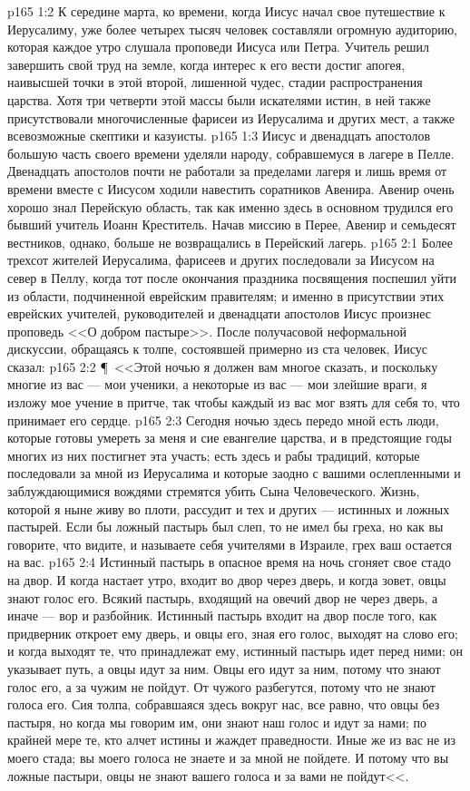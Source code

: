 \vs p165 1:2 К середине марта, ко времени, когда Иисус начал свое путешествие к Иерусалиму, уже более четырех тысяч человек составляли огромную аудиторию, которая каждое утро слушала проповеди Иисуса или Петра. Учитель решил завершить свой труд на земле, когда интерес к его вести достиг апогея, наивысшей точки в этой второй, лишенной чудес, стадии распространения царства. Хотя три четверти этой массы были искателями истин, в ней также присутствовали многочисленные фарисеи из Иерусалима и других мест, а также всевозможные скептики и казуисты.
\vs p165 1:3 Иисус и двенадцать апостолов большую часть своего времени уделяли народу, собравшемуся в лагере в Пелле. Двенадцать апостолов почти не работали за пределами лагеря и лишь время от времени вместе с Иисусом ходили навестить соратников Авенира. Авенир очень хорошо знал Перейскую область, так как именно здесь в основном трудился его бывший учитель Иоанн Креститель. Начав миссию в Перее, Авенир и семьдесят вестников, однако, больше не возвращались в Перейский лагерь.
\vs p165 2:1 Более трехсот жителей Иерусалима, фарисеев и других последовали за Иисусом на север в Пеллу, когда тот после окончания праздника посвящения поспешил уйти из области, подчиненной еврейским правителям; и именно в присутствии этих еврейских учителей, руководителей и двенадцати апостолов Иисус произнес проповедь <<О добром пастыре>>. После получасовой неформальной дискуссии, обращаясь к толпе, состоявшей примерно из ста человек, Иисус сказал:
\vs p165 2:2 \P\ <<Этой ночью я должен вам многое сказать, и поскольку многие из вас --- мои ученики, а некоторые из вас --- мои злейшие враги, я изложу мое учение в притче, так чтобы каждый из вас мог взять для себя то, что принимает его сердце.
\vs p165 2:3 Сегодня ночью здесь передо мной есть люди, которые готовы умереть за меня и сие евангелие царства, и в предстоящие годы многих из них постигнет эта участь; есть здесь и рабы традиций, которые последовали за мной из Иерусалима и которые заодно с вашими ослепленными и заблуждающимися вождями стремятся убить Сына Человеческого. Жизнь, которой я ныне живу во плоти, рассудит и тех и других --- истинных и ложных пастырей. Если бы ложный пастырь был слеп, то не имел бы греха, но как вы говорите, что видите, и называете себя учителями в Израиле, грех ваш остается на вас.
\vs p165 2:4 Истинный пастырь в опасное время на ночь сгоняет свое стадо на двор. И когда настает утро, входит во двор через дверь, и когда зовет, овцы знают голос его. Всякий пастырь, входящий на овечий двор не через дверь, а иначе --- вор и разбойник. Истинный пастырь входит на двор после того, как придверник откроет ему дверь, и овцы его, зная его голос, выходят на слово его; и когда выходят те, что принадлежат ему, истинный пастырь идет перед ними; он указывает путь, а овцы идут за ним. Овцы его идут за ним, потому что знают голос его, а за чужим не пойдут. От чужого разбегутся, потому что не знают голоса его. Сия толпа, собравшаяся здесь вокруг нас, все равно, что овцы без пастыря, но когда мы говорим им, они знают наш голос и идут за нами; по крайней мере те, кто алчет истины и жаждет праведности. Иные же из вас не из моего стада; вы моего голоса не знаете и за мной не пойдете. И потому что вы ложные пастыри, овцы не знают вашего голоса и за вами не пойдут<<.
